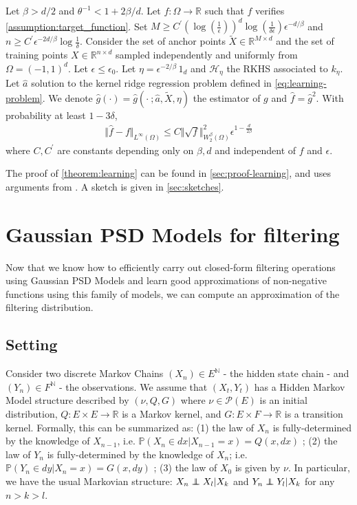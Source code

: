 \begin{theorem}\label{theorem:learning}
Let $\beta > d/2$ and $\theta^{-1} < 1 + 2\beta/d$.  Let $f:\Omega \to \mathbb R$ such that $f$ verifies \cref{assumption:target_function}. Set $M \geq C^\prime (\log(\frac{1}{\epsilon}))^d\log(\frac{1}{\delta\epsilon})\epsilon^{-d/\beta}$ and $n \geq C^\prime \epsilon^{-2 d/\beta} \log \frac{1}{\delta}$. Consider the set of anchor points $\tilde X \in \mathbb R^{M \times d}$ and the set of training points $X \in \mathbb R^{n \times d}$ sampled independently and uniformly from $\Omega = (-1, 1)^d$. Let $\epsilon\leq \epsilon_0$. Let $\eta = \epsilon^{-2/\beta} \, 1_d$ and $\mathcal H_\eta$ the RKHS associated to $k_\eta$. Let $\hat a$ solution to the kernel ridge regression problem defined in \cref{eq:learning-problem}. We denote $\hat g(\cdot) = \hat g(\cdot ~; \hat a, \tilde X, \eta)$ the estimator of $g$ and $\hat f = \hat g^2$. With probability at least $1 - 3\delta$,
\begin{align}
    \Vert \hat f - f \Vert_{L^\infty(\Omega)}\leq C \Vert \sqrt{f}\Vert_{W^\beta_2(\Omega)}^2\epsilon^{1-\frac{d}{2\beta}}
\end{align}
where $C, C^\prime$ are constants depending only on $\beta, d$ and independent of $f$ and $\epsilon$.
\end{theorem}
The proof of \cref{theorem:learning} can be found in \cref{sec:proof-learning}, and uses arguments from \cite{sampling-ulysse}. A sketch is given in \cref{sec:sketches}.


\section{Gaussian PSD Models for filtering}\label{sec:psd-filter-root}
Now that we know how to efficiently carry out closed-form filtering operations using Gaussian PSD Models and learn good approximations of non-negative functions using this family of models, we can compute an approximation of the filtering distribution.

\subsection{Setting}
Consider two discrete Markov Chains $(X_n)\in E^\mathbb N$ - the hidden state chain -  and $(Y_n)\in F^\mathbb N$ - the observations. We assume that $(X_t, Y_t)$ has a Hidden Markov Model structure described by $(\nu, Q, G)$ where $\nu\in\mathcal P(E)$ is an initial distribution, $Q:E\times E \to \mathbb R$ is a Markov kernel, and $G: E\times F \to \mathbb R$ is a transition kernel. Formally, this can be summarized as:
(1) the law of $X_n$ is fully-determined by the knowledge of $X_{n-1}$, i.e. $\mathbb P(X_n\in dx | X_{n-1}=x)=Q(x, dx)$ ;
(2) the law of $Y_n$ is fully-determined by the knowledge of $X_n$; i.e. $\mathbb P(Y_n\in dy |X_n=x) = G(x, dy)$ ;
(3) the law of $X_0$ is given by $\nu$. In particular, we have the usual Markovian structure: $X_n \independent X_l | X_{k}$ and $Y_n \independent Y_l | X_{k}$ for any $n > k > l$.

